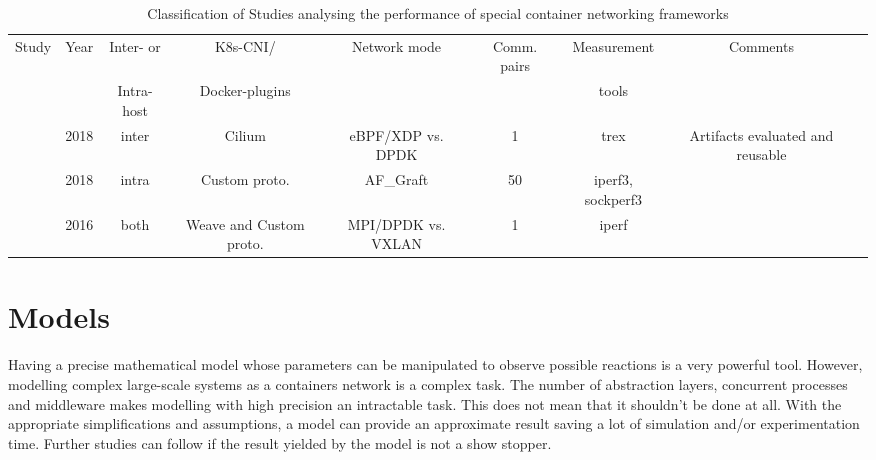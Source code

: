 \documentclass[conference]{IEEEtran}
\begin{document}
\begin{table}[h]

 \begin{center}

   \caption{ Classification of Studies analysing the performance of special container networking frameworks}\label{tab:1}

   \begin{tabular}{c c c c c c c c c}
     \hline
     Study & Year & Inter- or & K8s-CNI/& Network mode & Comm. pairs & Measurement& Comments  \\ 
      &  & Intra-host & Docker-plugins & & & tools &   \\ 
     \hline
     \cite{CoNEXT:2018} & 2018 & inter & Cilium & eBPF/XDP vs. DPDK & 1 & trex & Artifacts evaluated and reusable & \\
     \cite{Nakamura:2018} & 2018 & intra & Custom proto. & AF\_Graft & 50 & iperf3, sockperf3 & \\     
     \cite{HotNets:16:FreeFlow} & 2016 & both & Weave and Custom proto. & MPI/DPDK vs. VXLAN &1 & iperf & & \\
     \hline 

   \end{tabular}

 \end{center}
\end{table} 

\section{Models}
Having a precise mathematical model whose parameters can be manipulated to observe possible reactions is a very powerful tool. However, modelling complex large-scale systems as a containers network is a complex task. The number of abstraction layers, concurrent processes and middleware makes modelling with high precision an intractable task. This does not mean that it shouldn't be done at all. With the appropriate simplifications and assumptions, a model can provide an approximate result saving a lot of simulation and/or experimentation time. Further studies can follow if the result yielded by the model is not a show stopper.
\end{document}
